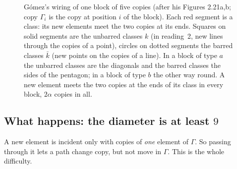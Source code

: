 \documentclass[11pt]{amsart}
\theoremstyle{definition}
\theoremstyle{remark}
\begin{document}
\begin{figure}[ht]
\centering
{}
\caption{G\'omez's wiring of one block of five copies (after his Figures 2.21a,b; copy $\Gamma_i$ is the copy at position $i$ of the block). Each red segment is a class: its new elements meet the two copies at its ends. Squares on solid segments are the unbarred classes $k$ (in reading~2, new lines through the copies of a point), circles on dotted segments the barred classes $\bar k$ (new points on the copies of a line). In a block of type $a$ the unbarred classes are the diagonals and the barred classes the sides of the pentagon; in a block of type $b$ the other way round. A new element meets the two copies at the ends of its class in every block, $2\alpha$ copies in all.}
\label{fig:pentagon}
\end{figure}

\subsection{What happens: the diameter is at least \texorpdfstring{$9$}{9}}\label{ssec:omegafail}
A new element is incident only with copies of \emph{one} element of $\Gamma$. So passing through it lets a path change copy, but not move in $\Gamma$. This is the whole difficulty.
\end{document}
